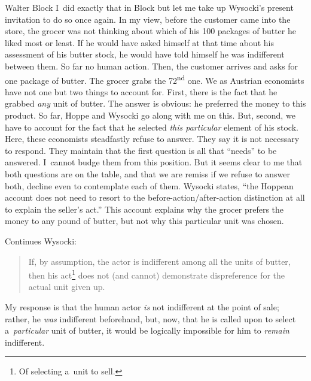 \begin{artengenv}{Walter Block}
I~did exactly that in Block 
\parencites*[][]{block_robert_1980}[][]{block_rejoinder_2009}[][]{block_rejoinder_2009-1}[][]{block_response_2012}[][]{block_rejoinder_2019}[][]{block_response_2022} %
 but let me take up Wysocki's present invitation to do so once again. In my view, before the customer came into the store, the grocer was not thinking about which of his 100 packages of butter he liked most or least. If he would have asked himself at that time about his assessment of his butter stock, he would have told himself he was indifferent between them. So far no human action. Then, the customer arrives and asks for one package of butter. The grocer grabs the 72\textsuperscript{nd} one. We as Austrian economists have not one but two things to account for. First, there is the fact that he grabbed \textit{any} unit of butter. The answer is obvious: he preferred the money to this product. So far, Hoppe and Wysocki go along with me on this. But, second, we have to account for the fact that he selected \textit{this particular} element of his stock. Here, these economists steadfastly refuse to answer. They say it is not necessary to respond. They maintain that the first question is all that ``needs'' to be answered. I~cannot budge them from this position. But it seems clear to me that both questions are on the table, and that we are remiss if we refuse to answer both, decline even to contemplate each of them. Wysocki states, ``the Hoppean account does not need to resort to the before-action/after-action distinction at all to explain the seller's act.'' This account explains why the grocer prefers the money to any pound of butter, but not why this particular unit was chosen.



Continues Wysocki:



\begin{quote}
If, by assumption, the actor is indifferent among all the units of butter, then his act\footnote{Of selecting a~unit to sell.} does not (and cannot) demonstrate dispreference for the actual unit given up.
\end{quote}



My response is that the human actor \textit{is} not indifferent at the point of sale; rather, he \textit{was} indifferent beforehand, but, now, that he is called upon to select a~\textit{particular} unit of butter, it would be logically impossible for him to \textit{remain} indifferent.




\end{artengenv}
